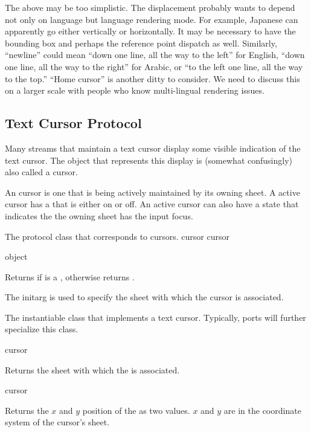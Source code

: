  {The above may be too simplistic. The displacement probably
wants to depend not only on language but language rendering mode.  For example,
Japanese can apparently go either vertically or horizontally.  It may be
necessary to have the bounding box and perhaps the reference point dispatch as
well.  Similarly, ``newline'' could mean ``down one line, all the way to the
left'' for English, ``down one line, all the way to the right'' for Arabic, or
``to the left one line, all the way to the top.''  ``Home cursor'' is another
ditty to consider.  We need to discuss this on a larger scale with people who
know multi-lingual rendering issues.}


\subsection {Text Cursor Protocol}

Many streams that maintain a text cursor display some visible indication of the
text cursor.  The object that represents this display is (somewhat confusingly)
also called a cursor.

An  cursor is one that is being actively maintained by its
owning sheet.  A active cursor has a  that is either on or off.
An active cursor can also have a state that indicates the the owning sheet has
the input focus.


The protocol class that corresponds to cursors.
 {cursor} {cursor}
\Mutable

 {object}

Returns  if  is a , otherwise returns
.


The  initarg is used to specify the sheet with which the cursor is
associated.


The instantiable class that implements a text cursor.  Typically, ports will
further specialize this class.

 {cursor}

Returns the sheet with which the   is associated.

 {cursor}

Returns the $x$ and $y$ position of the   as two
values.  $x$ and $y$ are in the coordinate system of the cursor's sheet.

